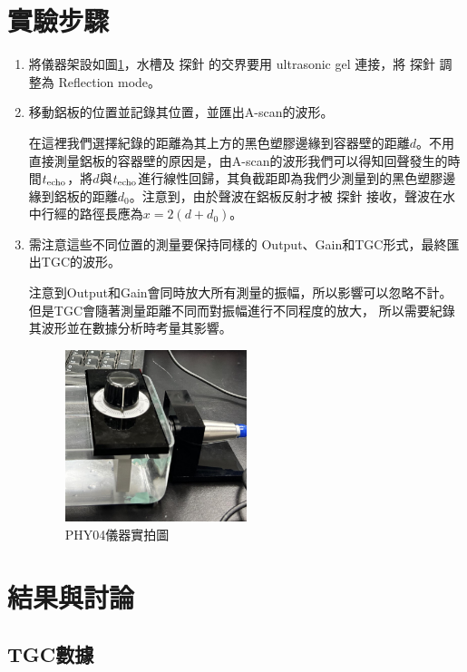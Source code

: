\documentclass[12pt]{report}
\begin{document}
\section{實驗步驟}

\begin{enumerate}
    \item 將儀器架設如圖\ref{fig:PHY04_apparatus}，水槽及 探針 的交界要用 ultrasonic gel 連接，將 探針 調整為 Reflection mode。
    \item 移動鋁板的位置並記錄其位置，並匯出A-scan的波形。
    
    在這裡我們選擇紀錄的距離為其上方的黑色塑膠邊緣到容器壁的距離$d$。不用直接測量鋁板的容器壁的原因是，由A-scan的波形我們可以得知回聲發生的時間$t_{\rm echo}$，將$d$與$t_{\rm echo}$進行線性回歸，其負截距即為我們少測量到的黑色塑膠邊緣到鋁板的距離$d_0$。注意到，由於聲波在鋁板反射才被 探針 接收，聲波在水中行經的路徑長應為$x=2(d+d_0)$。

    \item 需注意這些不同位置的測量要保持同樣的 Output、Gain和TGC形式，最終匯出TGC的波形。
    
    注意到Output和Gain會同時放大所有測量的振幅，所以影響可以忽略不計。但是TGC會隨著測量距離不同而對振幅進行不同程度的放大，
所以需要紀錄其波形並在數據分析時考量其影響。

\begin{figure}[htbp]
    \centering
    \includegraphics[width=0.5\textwidth]{PHY04_appratus.png}
    \caption{PHY04儀器實拍圖}
    \label{fig:PHY04_apparatus}
\end{figure}

\end{enumerate}

\section{結果與討論}

\subsection{TGC數據}
\end{document}
